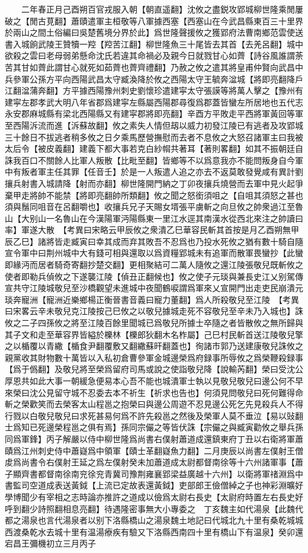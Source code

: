 　　二年春正月己酉朔百官戎服入朝【朝直遥翻】沈攸之盡鋭攻郢城柳世隆乘閒屢破之【閒古莧翻】蕭賾遣軍主桓敬等八軍據西塞【西塞山在今武昌縣東百三十里界於兩山之間土俗編曰吳楚舊境分界於此】爲世隆聲援攸之獲郢府法曹南鄉范雲使送書入城餉武陵王贊犢一羫【羫苦江翻】柳世隆魚三十尾皆去其首【去羌呂翻】城中欲殺之雲曰老母弱弟懸命沈氏若違其命禍必及親今日就戮甘心如薺【詩谷風誰謂荼苦其甘如薺此謂甘心就死如茹薺也薺齊禮翻】乃赦之攸之遣其將皇甫仲賢向武昌中兵參軍公孫方平向西陽武昌太守臧渙降於攸之西陽太守王毓奔湓城【將即亮翻降戶江翻湓蒲奔翻】方平據西陽豫州刺史劉懷珍遣建寜太守張謨等將萬人擊之【豫州有建寜左郡孝武大明八年省郡爲建寜左縣屬西陽郡尋復爲郡蓋皆蠻左所居地也五代志永安郡麻城縣有梁北西陽縣又有建寜郡將即亮翻】辛酉方平敗走平西將軍黃回等軍至西陽泝流而進【泝蘇故翻】攸之素失人情但刼以威力初發江陵已有逃者及攻郢城三十餘日不拔逃者稍多攸之日夕乘馬歷營撫慰而去者不息攸之大怒召諸軍主曰我被太后令【被皮義翻】建義下都大事若克白紗㡌共著耳【著則畧翻】如其不振朝廷自誅我百口不關餘人比軍人叛散【比毗至翻】皆鄉等不以爲意我亦不能問叛身自今軍中有叛者軍主任其罪【任音壬】於是一人叛遣人追之亦去不返莫敢發覺咸有異計劉攘兵射書入城請降【射而亦翻】柳世隆開門納之丁卯夜攘兵燒營而去軍中見火起爭棄甲走將帥不能禁【將即亮翻帥所類翻】攸之聞之怒銜須咀之【自咀其須怒之甚也須與鬚同咀音在呂翻嚼也】收攘兵兄子天賜女壻張平虜斬之向旦攸之帥衆過江至魯山【大别山一名魯山在今漢陽軍沔陽縣東一里江水逕其南漢水從西北來注之帥讀曰率】軍遂大散　【考異曰宋略云甲辰攸之衆潰乙巳華容民斬其首按是月乙酉朔無甲辰乙巳】諸將皆走臧寅曰幸其成而弃其敗吾不忍爲也乃投水死攸之猶有數十騎自隨宣令軍中曰荆州城中大有錢可相與還取以爲資糧郢城未有追軍而散軍畏蠻抄【此蠻即緣沔而居者騎奇寄翻抄楚交翻】更相聚結可二萬人隨攸之還江陵張敬兒既斬攸之使者即勒兵偵攸之下遂襲江陵【偵丑正翻候也】攸之使子元琰與兼長史江乂别駕傳宣共守江陵城敬兒至沙橋觀望未進城中夜聞鶴唳謂爲軍來乂宣開門出走吏民崩潰元琰奔寵洲【寵洲近樂鄉楊正衡晉書音義曰寵力董翻】爲人所殺敬兒至江陵　【考異曰宋畧云辛未敬兒克江陵按己巳攸之以敬兒據城走死不容敬兒至辛未乃入城也】誅攸之二子四孫攸之將至江陵百餘里聞城已爲敬兒所據士卒隨之者皆散攸之無所歸與其子文和走至華容界皆縊於櫟林【櫟郎狄翻木名柞屬】己巳村民斬首送江陵敬兒擎之以楯覆以青繖【楯食尹翻覆敷又翻繖蘇旰翻蓋也】徇諸市郭乃送建康敬兒誅攸之親黨收其財物數十萬皆以入私初倉曹參軍金城邊榮爲府録事所辱攸之爲榮鞭殺録事【爲于僞翻】及敬兒將至榮爲留府司馬或說之使詣敬兒降【說輸芮翻】榮曰受沈公厚恩共如此大事一朝緩急便易本心吾不能也城潰軍士執以見敬兒敬兒曰邊公何不早來榮曰沈公見留守城不忍委去本不祈生【祈求也告也】何須見問敬兒曰死何難得命斬之榮歡笑而去榮客太山程邕之抱榮曰與邊公周遊不忍見邊公死乞先見殺兵人不得行戮以白敬兒敬兒曰求死甚易何爲不許先殺邕之然後及榮軍人莫不垂泣【易以䜴翻士爲知已死邊榮程邕之俱有焉】孫同宗儼之等皆伏誅【宗儼之與臧寅勸攸之舉兵孫同爲軍鋒】丙子解嚴以侍中柳世隆爲尚書右僕射蕭道成還鎮東府丁丑以右衛將軍蕭賾爲江州刺史侍中蕭嶷爲中領軍【賾士革翻嶷魚力翻】二月庚辰以尚書左僕射王僧䖍爲尚書令右僕射王延之爲左僕射癸未加蕭道成太尉都督南徐等十六州諸軍事【蕭子顯齊書都督南徐南兖徐兖青冀司豫荆雍襄郢梁益廣越十六州】以衛將軍禇淵爲中書監司空道成表送黃鉞【上流已定故表還黃鉞】吏部郎王儉僧綽之子也神彩淵曠好學博聞少有宰相之志時論亦推許之道成以儉爲太尉右長史【太尉府時置左右長史好呼到翻少詩照翻相息亮翻】待遇隆密事無大小專委之　丁亥魏主如代湯泉【此魏代都之湯泉也言代湯泉者以别下洛縣橋山之湯泉魏土地記曰代城北九十里有桑乾城城西渡桑乾水去城十里有温湯療疾有驗又下洛縣西南四十里有橋山下有温泉】癸卯還　宕昌王彌機初立三月丙子